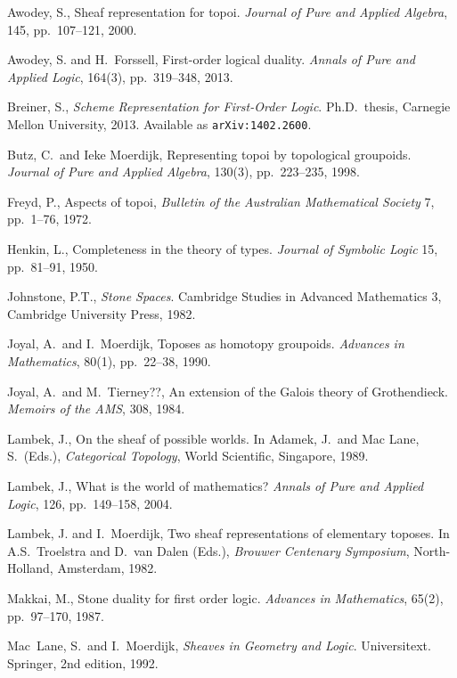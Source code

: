 \documentclass[12pt]{article}
\theoremstyle{remark}
\theoremstyle{definition}
\begin{document}
\begin{thebibliography}{300}

Awodey, S., Sheaf representation for topoi. 
\emph{Journal of Pure and Applied Algebra}, 145, pp.~107--121, 2000.

Awodey, S. and H.~Forssell, First-order logical duality. 
\emph{Annals of Pure and Applied Logic}, 164(3), pp.~319--348, 2013.

Breiner, S., \emph{Scheme Representation for First-Order Logic}. 
Ph.D.~thesis, Carnegie Mellon University, 2013.  Available as {\tt arXiv:1402.2600}.

Butz, C.\ and Ieke Moerdijk, Representing topoi by topological groupoids. 
\emph{Journal of Pure and Applied Algebra}, 130(3), pp.~223--235, 1998.

Freyd, P., Aspects of topoi, 
\emph{Bulletin of the Australian Mathematical Society} 7, pp.~1--76, 1972.
 
Henkin, L., Completeness in the theory of types. 
\emph{Journal of Symbolic Logic} 15, pp.~81--91, 1950.

Johnstone, P.T., \emph{Stone Spaces}. Cambridge Studies in Advanced Mathematics 3,
Cambridge University Press, 1982.

  Joyal, A.\ and I.~Moerdijk, Toposes as homotopy groupoids. 
\emph{Advances in Mathematics}, 80(1), pp.~22--38, 1990.

  Joyal, A.\  and M.\ Tierney??, An extension of the Galois theory of Grothendieck.
\emph{Memoirs of the AMS}, 308, 1984.

Lambek, J., On the sheaf of possible worlds. 
In Adamek, J.\ and  Mac Lane, S.\ (Eds.), \emph{Categorical Topology}, World Scientific, Singapore, 1989.

 Lambek, J., What is the world of mathematics? 
\emph{Annals of Pure and Applied Logic}, 126, pp.~149--158, 2004.

Lambek, J. and I.~Moerdijk, Two sheaf representations of elementary toposes. 
In A.S.\ Troelstra and D.\ van Dalen (Eds.), \emph{Brouwer Centenary Symposium}, North-Holland, Amsterdam, 1982.
 
 Makkai, M., Stone duality for first order logic. 
 \emph{Advances in Mathematics}, 65(2), pp.~97--170,  1987.
 
Mac~Lane, S.\ and I.~Moerdijk, \emph{Sheaves in Geometry and Logic}. Universitext. Springer, 2nd edition, 1992.

\end{thebibliography}








\end{document}
